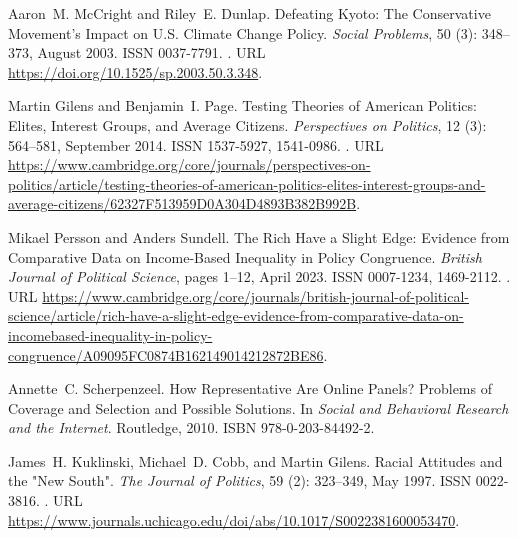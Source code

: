 \begin{thebibliography}{55}
  Aaron~M. McCright and Riley~E. Dunlap.
  \newblock Defeating {{Kyoto}}: {{The Conservative Movement}}'s {{Impact}} on
    {{U}}.{{S}}. {{Climate Change Policy}}.
  \newblock \emph{Social Problems}, 50 (3): 348--373, August
    2003.
  \newblock ISSN 0037-7791.
  \newblock {}.
  \newblock URL \url{https://doi.org/10.1525/sp.2003.50.3.348}.
  
  Martin Gilens and Benjamin~I. Page.
  \newblock Testing {{Theories}} of {{American Politics}}: {{Elites}}, {{Interest
    Groups}}, and {{Average Citizens}}.
  \newblock \emph{Perspectives on Politics}, 12 (3): 564--581,
    September 2014.
  \newblock ISSN 1537-5927, 1541-0986.
  \newblock {}.
  \newblock URL
    \url{https://www.cambridge.org/core/journals/perspectives-on-politics/article/testing-theories-of-american-politics-elites-interest-groups-and-average-citizens/62327F513959D0A304D4893B382B992B}.
  
  Mikael Persson and Anders Sundell.
  \newblock The {{Rich Have}} a {{Slight Edge}}: {{Evidence}} from {{Comparative
    Data}} on {{Income-Based Inequality}} in {{Policy Congruence}}.
  \newblock \emph{British Journal of Political Science}, pages 1--12, April 2023.
  \newblock ISSN 0007-1234, 1469-2112.
  \newblock {}.
  \newblock URL
    \url{https://www.cambridge.org/core/journals/british-journal-of-political-science/article/rich-have-a-slight-edge-evidence-from-comparative-data-on-incomebased-inequality-in-policy-congruence/A09095FC0874B162149014212872BE86}.
  
  Annette~C. Scherpenzeel.
  \newblock How {{Representative Are Online Panels}}? {{Problems}} of
    {{Coverage}} and {{Selection}} and {{Possible Solutions}}.
  \newblock In \emph{Social and {{Behavioral Research}} and the {{Internet}}}.
    Routledge, 2010.
  \newblock ISBN 978-0-203-84492-2.
  
  James~H. Kuklinski, Michael~D. Cobb, and Martin Gilens.
  \newblock Racial {{Attitudes}} and the "{{New South}}".
  \newblock \emph{The Journal of Politics}, 59 (2): 323--349,
    May 1997.
  \newblock ISSN 0022-3816.
  \newblock {}.
  \newblock URL
    \url{https://www.journals.uchicago.edu/doi/abs/10.1017/S0022381600053470}.
  

\end{thebibliography}
